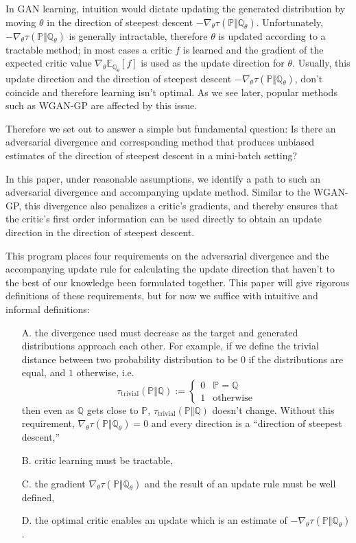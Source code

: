 \documentclass{article}
\begin{document}
 In GAN learning, intuition would dictate updating the generated distribution by moving $\theta$ in the direction of steepest descent
 $-\nabla_\theta\tau(\mathbb P\Vert\mathbb Q_\theta)$. Unfortunately, $-\nabla_\theta\tau(\mathbb P\Vert\mathbb Q_\theta)$
 is generally intractable, therefore $\theta$ is updated according to a tractable method; in most cases
 a critic $f$ is learned and the gradient of the expected critic value
 $\nabla_\theta\mathbb E_{\mathbb Q_\theta}[f]$ is used as the update direction for $\theta$.
 Usually, this update direction and the direction of steepest descent $-\nabla_\theta\tau(\mathbb P\Vert\mathbb Q_\theta)$,
 don't coincide and therefore learning isn't optimal.
 As we see later, popular methods such as WGAN-GP \cite{gulrajani2017improved} are affected by this issue.

 Therefore we set out to answer a simple but fundamental question:
 Is there an adversarial divergence and corresponding method that produces unbiased estimates of the direction of steepest descent in a mini-batch setting?

 In this paper, under reasonable assumptions, we identify a path
 to such an adversarial divergence and accompanying update method. Similar to the WGAN-GP,
 this divergence also penalizes a critic's gradients, and thereby ensures that
 the critic's first order information can be used directly to obtain an update direction
 in the direction of steepest descent.


 This program places four requirements
 on the adversarial divergence and the accompanying update rule for calculating the update direction
 that haven't to the best of our knowledge been formulated together.
 This paper will give rigorous definitions of these requirements, but for now we suffice with intuitive and informal definitions:
 \begin{enumerate}
  \item[A.] the divergence used must decrease as the target and generated distributions approach each other.
  For example, if we define the trivial distance between two probability distribution to be $0$ if the distributions
  are equal, and $1$ otherwise, i.e.\
  \[\tau_{\text{trivial}}(\mathbb P\Vert\mathbb Q):=\begin{cases}0 & \mathbb P=\mathbb Q \\ 1 & \text{otherwise}\end{cases}\]
  then even as $\mathbb Q$ gets close to $\mathbb P$, $\tau_{\text{trivial}}(\mathbb P\Vert\mathbb Q)$ doesn't change.
  Without this requirement, $\nabla_\theta\tau(\mathbb P\Vert\mathbb Q_\theta)=0$ and every direction is a ``direction of steepest descent,''
  \item[B.] critic learning must be tractable,
  \item[C.] the gradient $\nabla_\theta\tau(\mathbb P\Vert\mathbb Q_\theta)$ and the result of an update rule must be well defined,
  \item[D.] the optimal critic enables an update which is an estimate of $-\nabla_\theta\tau(\mathbb P\Vert\mathbb Q_\theta)$.
 \end{enumerate}
\end{document}
